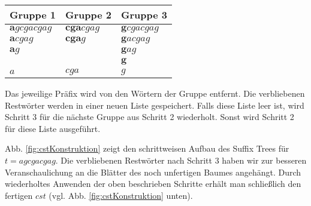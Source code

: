 \documentclass[12pt]{report}
\begin{document}
\begin{center}
\begin{tabular}{l l l}
    \toprule
    Gruppe 1                 & Gruppe 2               & Gruppe 3                \\
    \midrule
    $\boldsymbol{a}gcgacgag$ & $\boldsymbol{cga}cgag$ & $\boldsymbol{g}cgacgag$ \\
    $\boldsymbol{a}cgag$     & $\boldsymbol{cga}g$    & $\boldsymbol{g}acgag$   \\
    $\boldsymbol{a}g$        &                        & $\boldsymbol{g}ag$      \\
                             &                        & $\boldsymbol{g}$        \\
    \midrule
    $a$                      & $cga$                  & $g$                     \\
    \bottomrule
\end{tabular}
\end{center}
Das jeweilige Präfix wird von den Wörtern der Gruppe entfernt. Die verbliebenen Restwörter werden in einer neuen Liste gespeichert. Falls diese Liste leer ist, wird Schritt 3 für die nächste Gruppe aus Schritt 2 wiederholt. Sonst wird Schritt 2 für diese Liste ausgeführt.

Abb. \ref{fig:cstKonstruktion} zeigt den schrittweisen Aufbau des Suffix Trees für $t = agcgacgag$. Die verbliebenen Restwörter nach Schritt 3 haben wir zur besseren Veranschaulichung an die Blätter des noch unfertigen Baumes angehängt. Durch wiederholtes Anwenden der oben beschrieben Schritte erhält man schließlich den fertigen $cst$ (vgl. Abb. \ref{fig:cstKonstruktion} unten).
\end{document}
